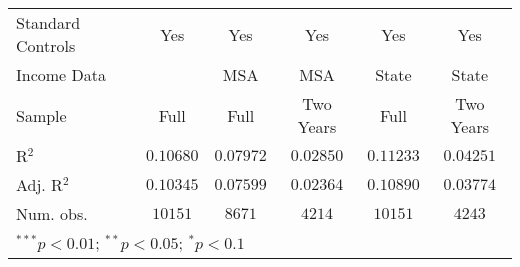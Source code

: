 \begin{tabular}{l c c c c c}
\hline
Standard Controls    & Yes               & Yes               & Yes              & Yes               & Yes              \\
Income Data          &                   & MSA               & MSA              & State             & State            \\
Sample               & Full              & Full              & Two Years        & Full              & Two Years        \\
R$^2$                & $0.10680$         & $0.07972$         & $0.02850$        & $0.11233$         & $0.04251$        \\
Adj. R$^2$           & $0.10345$         & $0.07599$         & $0.02364$        & $0.10890$         & $0.03774$        \\
Num. obs.            & $10151$           & $8671$            & $4214$           & $10151$           & $4243$           \\
\hline
\multicolumn{6}{l}{\scriptsize{$^{***}p<0.01$; $^{**}p<0.05$; $^{*}p<0.1$}}
\end{tabular}
